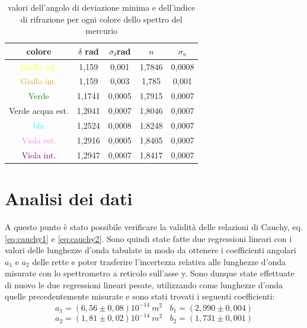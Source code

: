 \documentclass{article}
\begin{document}
        \begin{table}[H]

            \centering
            \begin{tabular}{ c c c c c  }

                \toprule 
                \textbf{colore} & $\delta$ rad & $\sigma_{\delta}$rad & $n$ & $\sigma_n$   \\
                
                \midrule
                \textcolor{yellow}{Giallo est.}	        &   1,159	&	0,001	&	1,7846 &   0,0008\\
                \textcolor{Goldenrod}{Giallo int.}      &   1,159	&	0,003	&	1,785  &   0,001 \\
                \textcolor{green}{Verde}                &   1,1741	&	0,0005	&	1,7915 &   0,0007\\
                \textcolor{Emerald}{Verde acqua est.}	&   1,2041	&	0,0007	&	1,8046 &	  0,0007\\
                \textcolor{cyan}{blu}                   &   1,2524	&	0,0008	&	 1,8248 &	  0,0007\\
                \textcolor{violet}{Viola est.}          &   1,2916	&	0,0005	&	1,8405 &	  0,0007\\
                \textcolor{purple}{Viola int.}	        &   1,2947	&	0,0007	&	 1,8417 &	  0,0007\\
                \bottomrule

            \end{tabular}

            \caption{valori dell'angolo di deviazione minima e dell'indice di rifrazione per ogni colore dello spettro del mercurio}
            \label{tabular:misure delta e n}

        \end{table}


    \section{Analisi dei dati}

        A questo punto è stato possibile verificare la validità delle relazioni di Cauchy, eq. \ref{eq:cauchy1} e \ref{eq:cauchy2}.
        Sono quindi state fatte due regressioni lineari con i valori delle lunghezze d'onda tabulate in modo da ottenere i coefficienti angolari $a_1$ e $a_2$
        delle rette e poter trasferire l'incertezza relativa alle lunghezze d'onda misurate con lo spettrometro a reticolo sull'asse y. 
        Sono dunque state effettuate di nuovo le due regressioni lineari pesate, utilizzando come lunghezze d'onda quelle precedentemente misurate e 
        sono stati trovati i seguenti coefficienti:
        \[a_1 = (6,56 \pm 0,08 )10^{-14}\ m^2\ \ \ \ b_1 = (2,990\pm 0,004)\]
        \[a_2 = (1,81 \pm 0,02 )10^{-14}\ m^2\ \ \ \ b_2 = (1,731\pm 0,001)\]
\end{document}
